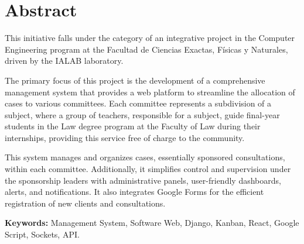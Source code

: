 
\chapter*{Abstract}

This initiative falls under the category of an integrative project in the Computer Engineering program at the  Facultad de Ciencias Exactas, Físicas y Naturales, driven by the IALAB laboratory.

The primary focus of this project is the development of a comprehensive management system that provides a web platform to streamline the allocation of cases to various committees. Each committee represents a subdivision of a subject, where a group of teachers, responsible for a subject, guide final-year students in the Law degree program at the Faculty of Law during their internships, providing this service free of charge to the community.

This system manages and organizes cases, essentially sponsored consultations, within each committee. Additionally, it simplifies control and supervision under the sponsorship leaders with administrative panels, user-friendly dashboards, alerts, and notifications. It also integrates Google Forms for the efficient registration of new clients and consultations.

\vspace{.5cm}

\textbf{Keywords:} Management System, Software Web, Django, Kanban, React, Google Script, Sockets, API.


\vspace{.5cm}
